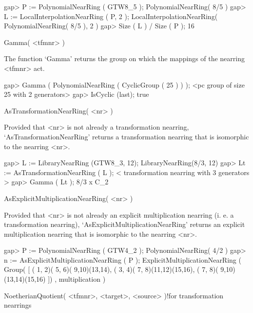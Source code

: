 \beginexample
    gap> P := PolynomialNearRing ( GTW8_5 );
    PolynomialNearRing( 8/5 )
    gap> L := LocalInterpolationNearRing ( P, 2 );
    LocalInterpolationNearRing( PolynomialNearRing( 8/5 ), 2 )
    gap> Size ( L ) / Size ( P );
    16
\endexample


   
\>Gamma( <tfmnr> )

The function `Gamma' returns the group on which the mappings of the
nearring <tfmnr> act.

\beginexample
    gap> Gamma ( PolynomialNearRing ( CyclicGroup ( 25 ) ) );
    <pc group of size 25 with 2 generators>
    gap> IsCyclic (last);
    true
\endexample




\>AsTransformationNearRing( <nr> )

Provided that <nr> is not already a transformation nearring,
`AsTransformationNearRing' returns a transformation nearring that is isomorphic
to the nearring <nr>.

\beginexample
    gap> L := LibraryNearRing (GTW8_3, 12);
    LibraryNearRing(8/3, 12)
    gap> Lt := AsTransformationNearRing ( L );
    < transformation nearring with 3 generators >
    gap> Gamma ( Lt );
    8/3 x C_2
\endexample

\>AsExplicitMultiplicationNearRing( <nr> )

Provided that <nr> is not already an explicit multiplication nearring
(i. e. a transformation nearring), `AsExplicitMultiplicationNearRing' returns
an explicit multiplication nearring that is isomorphic to the nearring <nr>.

\beginexample
    gap> P := PolynomialNearRing ( GTW4_2 );
    PolynomialNearRing( 4/2 )
    gap> n := AsExplicitMultiplicationNearRing ( P );
    ExplicitMultiplicationNearRing ( Group(
    [ ( 1, 2)( 5, 6)( 9,10)(13,14), ( 3, 4)( 7, 8)(11,12)(15,16), 
      ( 7, 8)( 9,10)(13,14)(15,16) ]) , multiplication )
\endexample




\>NoetherianQuotient( <tfmnr>, <target>, <source> )!{for transformation nearrings}

